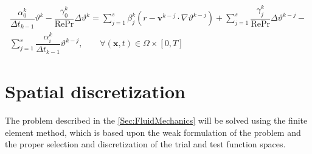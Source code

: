\documentclass[]{scrartcl}
\newcommand{\bs}[1]{\boldsymbol{#1}}
\begin{document}
\begin{equation}
	\begin{split}\label{Eqn:VSIMEXDiffusionStep}
		\dfrac{\alpha_0^k}{\Delta t_{k-1}} \vartheta^{k} -\dfrac{\gamma_0^k}{\textrm{Re}\textrm{Pr}} \Delta \vartheta^{k} = \sum_{j=1}^{s} \beta_j^k \left(r - \bs{v}^{k-j} \cdot \nabla \vartheta^{k-j}\right) + 
		\sum_{j=1}^{s} \dfrac{\gamma_j^k}{\textrm{Re}\textrm{Pr}} \Delta \vartheta^{k-j} - \\  \sum_{j=1}^{s} \dfrac{\alpha_i^k}{\Delta t_{k-1}}\vartheta^{k-j}, \qquad \forall(\bs{x},t)\in \Omega \times [0, T]
	\end{split}
\end{equation}

\section{Spatial discretization}
The problem described in the \cref{Sec:FluidMechanics} will be solved using the finite element method, which is based upon the weak formulation of the problem and the proper selection and discretization of the trial and test function spaces.
\end{document}
